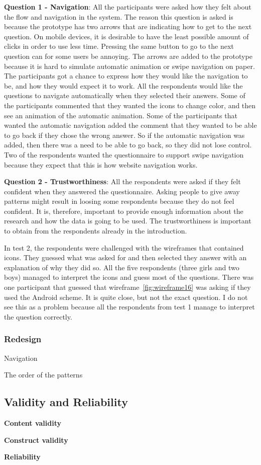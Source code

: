   {\bf Question 1 - Navigation}: All the participants were asked how they felt about the flow and navigation in the system. The reason this question is asked is because the prototype has two arrows that are indicating how to get to the next question. On mobile devices, it is desirable to have the least possible amount of clicks in order to use less time. Pressing the same button to go to the next question can for some users be annoying. The arrows are added to the prototype because it is hard to simulate automatic animation or swipe navigation on paper. The participants got a chance to express how they would like the navigation to be, and how they would expect it to work. All the respondents would like the questions to navigate automatically when they selected their answers. Some of the participants commented that they wanted the icons to change color, and then see an animation of the automatic animation. Some of the participants that wanted the automatic navigation added the comment that they wanted to be able to go back if they chose the wrong answer. So if the automatic navigation was added, then there was a need to be able to go back, so they did not lose control. Two of the respondents wanted the questionnaire to support swipe navigation because they expect that this is how website navigation works.

  {\bf Question 2 - Trustworthiness}: All the respondents were asked if they felt confident when they answered the questionnaire. Asking people to give away patterns might result in loosing some respondents because they do not feel confident. It is, therefore, important to provide enough information about the research and how the data is going to be used. The trustworthiness is important to obtain from the respondents already in the introduction. 

  In test 2, the respondents were challenged with the wireframes that contained icons. They guessed what was asked for and then selected they answer with an explanation of why they did so. All the five respondents (three girls and two boys) managed to interpret the icons and guess most of the questions. There was one participant that guessed that wireframe~\ref{fig:wireframe16} was asking if they used the Android scheme. It is quite close, but not the exact question. I do not see this as a problem because all the respondents from test 1 manage to interpret the question correctly.

  \subsubsection*{Redesign}

  Navigation

  The order of the patterns

  \subsection{Validity and Reliability}\label{sec:validityandreliability}

    {\bf Content validity}

    {\bf Construct validity}

    {\bf Reliability}